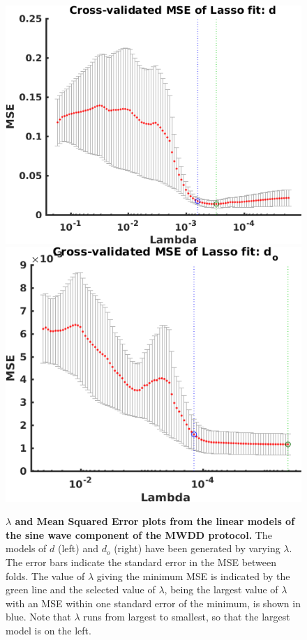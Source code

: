 \documentclass[11pt,a4paper,oneside]{article}
\begin{document}
\begin{figure}[hb]
\begin{center}
\includegraphics[scale=0.42]{Figures/LASSO_MWDD_AP_full_lambda_d.png}
\includegraphics[scale=0.42]{Figures/LASSO_MWDD_AP_full_lambda_od.png}
\caption{\textbf{$\lambda$ and Mean Squared Error plots from the linear models of the sine wave component of the MWDD protocol.} The models of $d$ (left) and $d_o$ (right) have been generated by varying $\lambda$. The error bars indicate the standard error in the MSE between folds. The value of $\lambda$ giving the minimum MSE is indicated by the green line and the selected value of $\lambda$, being the largest value of $\lambda$ with an MSE within one standard error of the minimum, is shown in blue. Note that $\lambda$ runs from largest to smallest, so that the largest model is on the left.}
\label{Fig_LASSO_MWDD_AP_full_lambda}
\end{center}
\end{figure}
\end{document}
